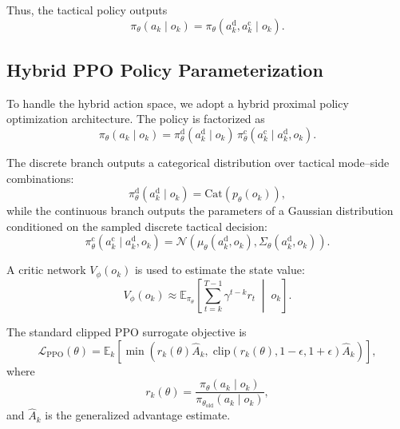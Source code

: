 \documentclass[final ,3p, times]{elsarticle}
\begin{document}
Thus, the tactical policy outputs
\begin{equation}
\pi_\theta(a_k\mid o_k)
=
\pi_\theta\!\left(a_k^{\mathrm{d}},a_k^{\mathrm{c}}\mid o_k\right).
\label{eq:joint_policy_factorization_general}
\end{equation}

\subsection{Hybrid PPO Policy Parameterization}
\label{subsec:hybrid_ppo}

To handle the hybrid action space, we adopt a hybrid proximal policy optimization architecture. The policy is factorized as
\begin{equation}
\pi_\theta(a_k\mid o_k)
=
\pi_\theta^{\mathrm{d}}(a_k^{\mathrm{d}}\mid o_k)
\,
\pi_\theta^{\mathrm{c}}(a_k^{\mathrm{c}}\mid a_k^{\mathrm{d}}, o_k).
\label{eq:joint_policy_factorization}
\end{equation}

The discrete branch outputs a categorical distribution over tactical mode--side combinations:
\begin{equation}
\pi_\theta^{\mathrm{d}}(a_k^{\mathrm{d}}\mid o_k)
=
\mathrm{Cat}\left(p_\theta(o_k)\right),
\label{eq:categorical_policy}
\end{equation}
while the continuous branch outputs the parameters of a Gaussian distribution conditioned on the sampled discrete tactical decision:
\begin{equation}
\pi_\theta^{\mathrm{c}}(a_k^{\mathrm{c}}\mid a_k^{\mathrm{d}},o_k)
=
\mathcal{N}\!\left(
\mu_\theta(a_k^{\mathrm{d}},o_k),
\Sigma_\theta(a_k^{\mathrm{d}},o_k)
\right).
\label{eq:gaussian_policy}
\end{equation}

A critic network $V_\phi(o_k)$ is used to estimate the state value:
\begin{equation}
V_\phi(o_k)
\approx
\mathbb{E}_{\pi_\theta}
\left[
\sum_{t=k}^{T-1}\gamma^{t-k}r_t
\;\middle|\;
o_k
\right].
\label{eq:value_function}
\end{equation}

The standard clipped PPO surrogate objective is
\begin{equation}
\mathcal{L}_{\mathrm{PPO}}(\theta)
=
\mathbb{E}_k
\left[
\min\left(
r_k(\theta)\hat A_k,\;
\mathrm{clip}\!\left(r_k(\theta),1-\epsilon,1+\epsilon\right)\hat A_k
\right)
\right],
\label{eq:ppo_surrogate}
\end{equation}
where
\begin{equation}
r_k(\theta)
=
\frac{
\pi_\theta(a_k\mid o_k)
}{
\pi_{\theta_{\mathrm{old}}}(a_k\mid o_k)
},
\label{eq:policy_ratio}
\end{equation}
and $\hat A_k$ is the generalized advantage estimate.
\end{document}
